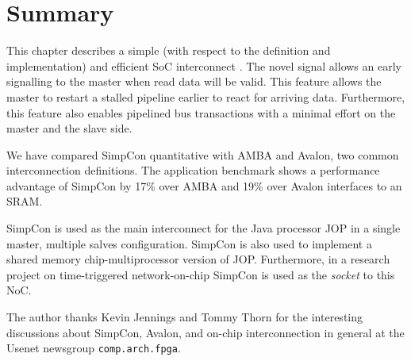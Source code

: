 \section{Summary}

This chapter describes a simple (with respect to the definition and
implementation) and efficient SoC interconnect \cite{simpcon}. The
novel signal  allows an early signalling to the master
when read data will be valid. This feature allows the master to
restart a stalled pipeline earlier to react for arriving data.
Furthermore, this feature also enables pipelined bus transactions
with a minimal effort on the master and the slave side.

We have compared SimpCon quantitative with AMBA and Avalon, two
common interconnection definitions. The application benchmark shows a
performance advantage of SimpCon by 17\% over AMBA and 19\% over
Avalon interfaces to an SRAM.

SimpCon is used as the main interconnect for the Java processor JOP
in a single master, multiple salves configuration. SimpCon is also
used to implement a shared memory chip-multiprocessor version of JOP.
Furthermore, in a research project on time-triggered network-on-chip
\cite{jop:ttnoc} SimpCon is used as the \emph{socket} to this NoC.

The author thanks Kevin Jennings and Tommy Thorn for the interesting
discussions about SimpCon, Avalon, and on-chip interconnection in
general at the Usenet newsgroup \texttt{comp.arch.fpga}.

